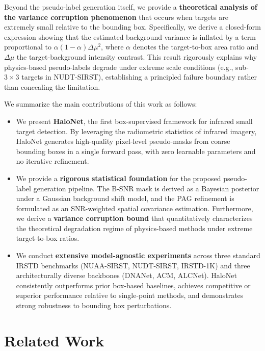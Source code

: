 Beyond the pseudo-label generation itself, we provide a \textbf{theoretical analysis of the variance corruption phenomenon} that occurs when targets are extremely small relative to the bounding box.
Specifically, we derive a closed-form expression showing that the estimated background variance is inflated by a term proportional to $\alpha(1-\alpha)\Delta\mu^2$, where $\alpha$ denotes the target-to-box area ratio and $\Delta\mu$ the target-background intensity contrast.
This result rigorously explains why physics-based pseudo-labels degrade under extreme scale conditions (e.g., sub-$3\times3$ targets in NUDT-SIRST), establishing a principled failure boundary rather than concealing the limitation.

We summarize the main contributions of this work as follows:

\begin{itemize}
    \item We present \textbf{HaloNet}, the first box-supervised framework for infrared small target detection.
    By leveraging the radiometric statistics of infrared imagery, HaloNet generates high-quality pixel-level pseudo-masks from coarse bounding boxes in a single forward pass, with zero learnable parameters and no iterative refinement.

    \item We provide a \textbf{rigorous statistical foundation} for the proposed pseudo-label generation pipeline.
    The B-SNR mask is derived as a Bayesian posterior under a Gaussian background shift model, and the PAG refinement is formulated as an SNR-weighted spatial covariance estimation.
    Furthermore, we derive a \textbf{variance corruption bound} that quantitatively characterizes the theoretical degradation regime of physics-based methods under extreme target-to-box ratios.

    \item We conduct \textbf{extensive model-agnostic experiments} across three standard IRSTD benchmarks (NUAA-SIRST, NUDT-SIRST, IRSTD-1K) and three architecturally diverse backbones (DNANet, ACM, ALCNet).
    HaloNet consistently outperforms prior box-based baselines, achieves competitive or superior performance relative to single-point methods, and demonstrates strong robustness to bounding box perturbations.
\end{itemize}


\section{Related Work}\label{sec:related}

